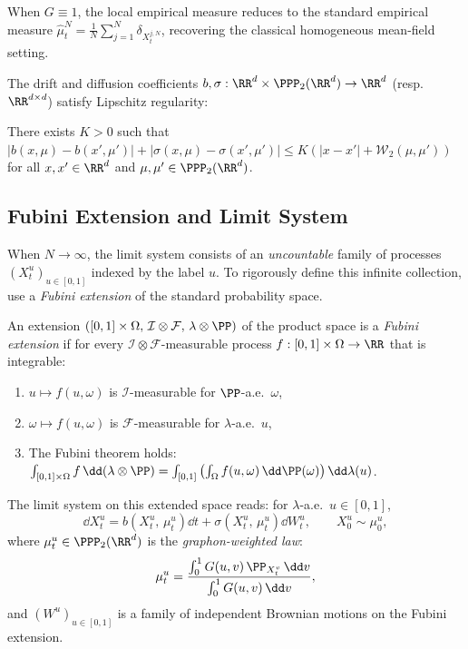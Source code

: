 \documentclass[11pt]{article}
\begin{document}
\begin{remark}
  When $G \equiv 1$, the local empirical measure reduces to the standard empirical measure $\hat{\mu}_t^N = \frac{1}{N}\sum_{j=1}^N \delta_{X_t^{j,N}}$, recovering the classical homogeneous mean-field setting.
\end{remark}

The drift and diffusion coefficients $b, \sigma : \RR^d \times \PPP_2(\RR^d) \to \RR^d$ (resp.\ $\RR^{d \times d}$) satisfy Lipschitz regularity:
\begin{assumption}\label{ass:lipschitz}
  There exists $K > 0$ such that $|b(x,\mu) - b(x',\mu')| + |\sigma(x,\mu) - \sigma(x',\mu')| \le K(|x-x'| + \mathcal{W}_2(\mu,\mu'))$ for all $x, x' \in \RR^d$ and $\mu, \mu' \in \PPP_2(\RR^d)$.
\end{assumption}

\subsection{Fubini Extension and Limit System}\label{sec:fubini}

When $N \to \infty$, the limit system consists of an \emph{uncountable} family of processes $(X_t^u)_{u \in [0,1]}$ indexed by the label $u$. To rigorously define this infinite collection, \citet{coppini2025graphon} use a \emph{Fubini extension} of the standard probability space.

\begin{definition}
  An extension $([0,1] \times \Omega, \, \mathcal{I} \otimes \mathcal{F}, \, \lambda \otimes \PP)$ of the product space is a \emph{Fubini extension} if for every $\mathcal{I} \otimes \mathcal{F}$-measurable process $f : [0,1] \times \Omega \to \RR$ that is integrable:
  \begin{enumerate}
    \item $u \mapsto f(u, \omega)$ is $\mathcal{I}$-measurable for $\PP$-a.e.\ $\omega$,
    \item $\omega \mapsto f(u, \omega)$ is $\mathcal{F}$-measurable for $\lambda$-a.e.\ $u$,
    \item The Fubini theorem holds: $\int_{[0,1] \times \Omega} f\,\dd(\lambda \otimes \PP) = \int_{[0,1]} \left(\int_\Omega f(u,\omega)\,\dd\PP(\omega)\right)\dd\lambda(u)$.
  \end{enumerate}
\end{definition}

The limit system on this extended space reads: for $\lambda$-a.e.\ $u \in [0,1]$,
\begin{equation}\label{eq:graphon-limit}
  \dd X_t^u = b\!\left(X_t^u, \, \mu_t^u\right)\dd t + \sigma\!\left(X_t^u, \, \mu_t^u\right)\dd W_t^u, \qquad X_0^u \sim \mu_0^u,
\end{equation}
where $\mu_t^u \in \PPP_2(\RR^d)$ is the \emph{graphon-weighted law}:
\begin{equation}\label{eq:graphon-law}
  \mu_t^u = \frac{\int_0^1 G(u,v)\,\PP_{X_t^v}\,\dd v}{\int_0^1 G(u,v)\,\dd v},
\end{equation}
and $(W^u)_{u \in [0,1]}$ is a family of independent Brownian motions on the Fubini extension.
\end{document}
